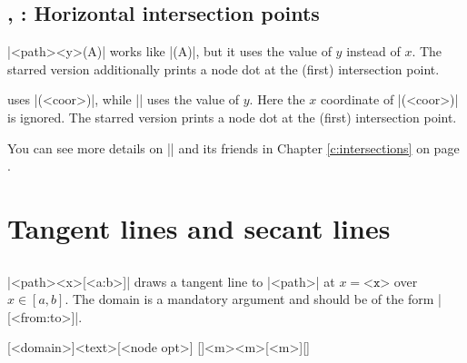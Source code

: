 \subsection{\protect\cmd{\tzhXpointat(*)}, \protect\cmd{\tzhXpoint(*)}: Horizontal intersection points}
\label{ssi:tzhXpoint}

\icmd{\tzhXpointat}|{<path>}{<y>}(A)| works like |(A)|, but it uses the value of $y$ instead of $x$.
The starred version \icmd{\tzhXpointat*} additionally prints a node dot at the (first) intersection point.

\icmd{\tzhXpoint} uses |(<coor>)|, while |\tzhXpointat| uses the value of $y$.
Here the $x$ coordinate of |(<coor>)| is ignored.
The starred version \icmd{\tzhXpoint*} prints a node dot at the (first) intersection point.

\begin{tzcode}{.3}
\end{tzcode}

You can see more details on |\tzXpoint| and its friends in Chapter \ref{c:intersections} on page \pageref{c:intersections}.


\section{Tangent lines and secant lines}
\label{si:tangentlines}

\subsection{\protect\cmd{\tztangentat}}
\label{ssi:tztangentat}

\icmd{\tztangentat}|{<path>}{<x>}[<a:b>]| draws a tangent line to |<path>| at $x=\texttt{<x>}$ over $x\in [a,b]$.
The domain is a mandatory argument and should be of the form |[<from:to>]|.

\begin{tzdef}
[<domain>]{<text>}[<node opt>]
  []{<m>}{<m>}[<m>]{}[]
\end{tzdef}


